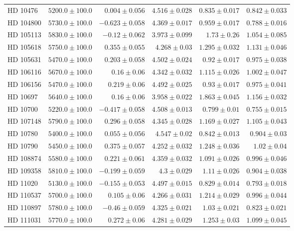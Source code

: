 \begin{longtable*}{lrrrrr}
HD 10476 & $5200.0\pm 100.0$ & $0.004\pm 0.056$ & $4.516\pm 0.028$ & $0.835\pm 0.017$ & $0.842\pm 0.033$ \\ 
HD 104800 & $5730.0\pm 100.0$ & $-0.623\pm 0.058$ & $4.369\pm 0.017$ & $0.959\pm 0.017$ & $0.788\pm 0.016$ \\ 
HD 105113 & $5830.0\pm 100.0$ & $-0.12\pm 0.062$ & $3.973\pm 0.099$ & $1.73\pm 0.26$ & $1.054\pm 0.085$ \\ 
HD 105618 & $5750.0\pm 100.0$ & $0.355\pm 0.055$ & $4.268\pm 0.03$ & $1.295\pm 0.032$ & $1.131\pm 0.046$ \\ 
HD 105631 & $5470.0\pm 100.0$ & $0.203\pm 0.058$ & $4.502\pm 0.024$ & $0.92\pm 0.017$ & $0.975\pm 0.038$ \\ 
HD 106116 & $5670.0\pm 100.0$ & $0.16\pm 0.06$ & $4.342\pm 0.032$ & $1.115\pm 0.026$ & $1.002\pm 0.047$ \\ 
HD 106156 & $5470.0\pm 100.0$ & $0.219\pm 0.06$ & $4.492\pm 0.025$ & $0.93\pm 0.017$ & $0.975\pm 0.041$ \\ 
HD 10697 & $5640.0\pm 100.0$ & $0.16\pm 0.06$ & $3.958\pm 0.022$ & $1.863\pm 0.045$ & $1.156\pm 0.032$ \\ 
HD 10700 & $5220.0\pm 100.0$ & $-0.417\pm 0.058$ & $4.508\pm 0.013$ & $0.799\pm 0.01$ & $0.755\pm 0.015$ \\ 
HD 107148 & $5790.0\pm 100.0$ & $0.296\pm 0.058$ & $4.345\pm 0.028$ & $1.169\pm 0.027$ & $1.105\pm 0.043$ \\ 
HD 10780 & $5400.0\pm 100.0$ & $0.055\pm 0.056$ & $4.547\pm 0.02$ & $0.842\pm 0.013$ & $0.904\pm 0.03$ \\ 
HD 10790 & $5450.0\pm 100.0$ & $0.375\pm 0.057$ & $4.252\pm 0.032$ & $1.248\pm 0.036$ & $1.02\pm 0.04$ \\ 
HD 108874 & $5580.0\pm 100.0$ & $0.221\pm 0.061$ & $4.359\pm 0.032$ & $1.091\pm 0.026$ & $0.996\pm 0.046$ \\ 
HD 109358 & $5810.0\pm 100.0$ & $-0.199\pm 0.059$ & $4.3\pm 0.029$ & $1.11\pm 0.026$ & $0.904\pm 0.038$ \\ 
HD 11020 & $5130.0\pm 100.0$ & $-0.155\pm 0.053$ & $4.497\pm 0.015$ & $0.829\pm 0.014$ & $0.793\pm 0.018$ \\ 
HD 110537 & $5700.0\pm 100.0$ & $0.105\pm 0.06$ & $4.266\pm 0.031$ & $1.214\pm 0.029$ & $0.996\pm 0.044$ \\ 
HD 110897 & $5780.0\pm 100.0$ & $-0.46\pm 0.059$ & $4.325\pm 0.021$ & $1.03\pm 0.021$ & $0.823\pm 0.021$ \\ 
HD 111031 & $5770.0\pm 100.0$ & $0.272\pm 0.06$ & $4.281\pm 0.029$ & $1.253\pm 0.03$ & $1.099\pm 0.045$ \\ 

\end{longtable*}
